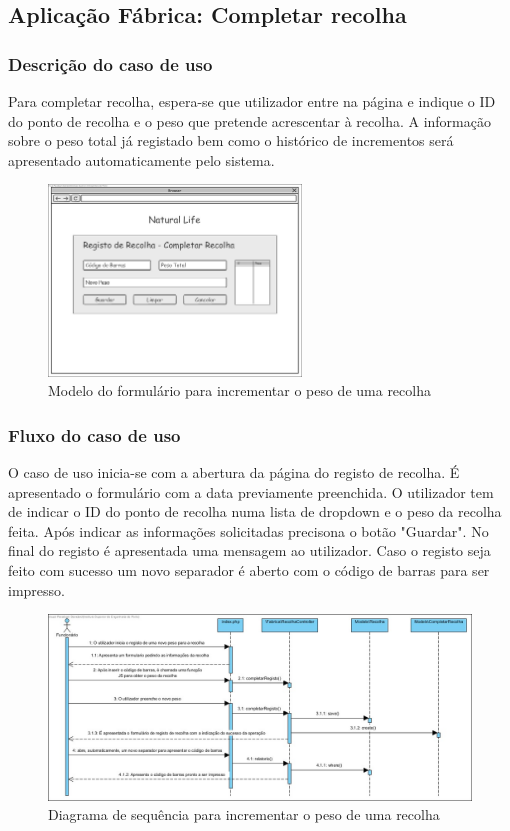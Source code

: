 \subsection{Aplicação Fábrica: Completar recolha}
\subsubsection*{Descrição do caso de uso}
Para completar recolha, espera-se que utilizador entre na página e indique o ID do ponto de recolha e o peso que pretende acrescentar à recolha. A informação sobre o peso total já registado bem como o histórico de incrementos será apresentado automaticamente pelo sistema. 

\begin{figure}[H] 
	\begin{center}
		\includegraphics[width=0.60\textwidth,keepaspectratio]{figuras/Diagramas_vp/DI_Fabrica_7_Completa_Recolha.jpg}
		\caption{Modelo do formulário para incrementar o peso de uma recolha}
		\label{fig:di_completar_recolha} 
	\end{center}
\end{figure}

\subsubsection*{Fluxo do caso de uso}
O caso de uso inicia-se com a abertura da página do registo de recolha. É apresentado o formulário com a data previamente preenchida. O utilizador tem de indicar o ID do ponto de recolha numa lista de dropdown e o peso da recolha feita. Após indicar as informações solicitadas precisona o botão "Guardar". No final do registo é apresentada uma mensagem ao utilizador. Caso o registo seja feito com sucesso um novo separador é aberto com o código de barras para ser impresso.


\begin{figure}[H] 
	\begin{center}
		\includegraphics[width=\textwidth,keepaspectratio]{figuras/Diagramas_vp/SD_Fabrica_7_Completar_Recolha.jpg}
		\caption{Diagrama de sequência para incrementar o peso de uma recolha}
		\label{fig:sd_completar_recolha} 
	\end{center}
\end{figure}